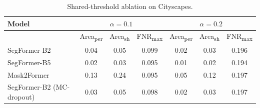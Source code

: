 \begin{table}[t]
\centering
\caption{Shared-threshold ablation on Cityscapes.}
\label{tab:ablations}
\scriptsize
\setlength{\tabcolsep}{2.5pt}
\begin{tabular}{lcccccc}
\toprule
Model & \multicolumn{3}{c}{$\alpha=0.1$} & \multicolumn{3}{c}{$\alpha=0.2$} \\
\midrule
 & Area\textsubscript{per} & Area\textsubscript{sh} & FNR\textsubscript{max} & Area\textsubscript{per} & Area\textsubscript{sh} & FNR\textsubscript{max} \\
\midrule
SegFormer-B2 & 0.04 & 0.05 & 0.099 & 0.02 & 0.03 & 0.196 \\
SegFormer-B5 & 0.02 & 0.03 & 0.095 & 0.01 & 0.02 & 0.194 \\
Mask2Former & 0.13 & 0.24 & 0.095 & 0.05 & 0.12 & 0.197 \\
SegFormer-B2 (MC-dropout) & 0.03 & 0.05 & 0.098 & 0.02 & 0.03 & 0.197 \\
\bottomrule
\end{tabular}
\end{table}
